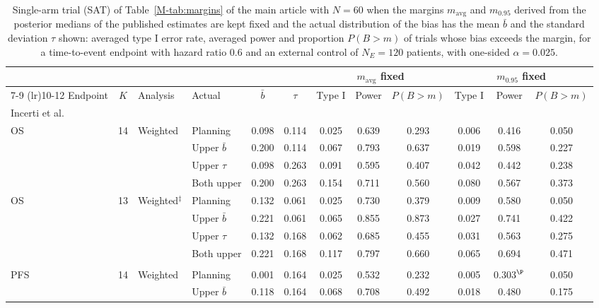 \begin{table}[!htb]
\centering
\footnotesize
\setlength{\tabcolsep}{2pt}
\caption{Single-arm trial (SAT) of Table~\ref{M-tab:margins} of the main article with $N = 60$ when the margins $m_{\mathrm{avg}}$ and $m_{0.95}$ derived from the posterior medians of the published estimates are kept fixed and the actual distribution of the bias has the mean $\bar{b}$ and the standard deviation $\tau$ shown: averaged type I error rate, averaged power and proportion $P(B > m)$ of trials whose bias exceeds the margin, for a time-to-event endpoint with hazard ratio 0.6 and an external control of $N_E = 120$ patients, with one-sided $\alpha = 0.025$.}
\label{tab:fixed_margin}
\begin{tabular}{lcllcccccccc}
\toprule
 & & & & & & \multicolumn{3}{c}{$m_{\mathrm{avg}}$ fixed} & \multicolumn{3}{c}{$m_{0.95}$ fixed} \\
\cmidrule(lr){7-9} \cmidrule(lr){10-12}
Endpoint & $K$ & Analysis & Actual & $\bar{b}$ & $\tau$ & Type I & Power & $P(B > m)$ & Type I & Power & $P(B > m)$ \\
\midrule
\multicolumn{12}{l}{Incerti et al.~\cite{Incerti2023}} \\
OS & 14 & Weighted & Planning & 0.098 & 0.114 & 0.025 & 0.639 & 0.293 & 0.006 & 0.416 & 0.050 \\
 &  &  & Upper $\bar{b}$ & 0.200 & 0.114 & 0.067 & 0.793 & 0.637 & 0.019 & 0.598 & 0.227 \\
 &  &  & Upper $\tau$ & 0.098 & 0.263 & 0.091 & 0.595 & 0.407 & 0.042 & 0.442 & 0.238 \\
 &  &  & Both upper & 0.200 & 0.263 & 0.154 & 0.711 & 0.560 & 0.080 & 0.567 & 0.373 \\
OS & 13 & Weighted$^{\ddagger}$ & Planning & 0.132 & 0.061 & 0.025 & 0.730 & 0.379 & 0.009 & 0.580 & 0.050 \\
 &  &  & Upper $\bar{b}$ & 0.221 & 0.061 & 0.065 & 0.855 & 0.873 & 0.027 & 0.741 & 0.422 \\
 &  &  & Upper $\tau$ & 0.132 & 0.168 & 0.062 & 0.685 & 0.455 & 0.031 & 0.563 & 0.275 \\
 &  &  & Both upper & 0.221 & 0.168 & 0.117 & 0.797 & 0.660 & 0.065 & 0.694 & 0.471 \\
\addlinespace
\multicolumn{12}{l}{Bahmane et al.~\cite{Bahmane2025}} \\
PFS & 14 & Weighted & Planning & 0.001 & 0.164 & 0.025 & 0.532 & 0.232 & 0.005 & 0.303$^{\P}$ & 0.050 \\
 &  &  & Upper $\bar{b}$ & 0.118 & 0.164 & 0.068 & 0.708 & 0.492 & 0.018 & 0.480 & 0.175 \\

\end{tabular}
\end{table}
